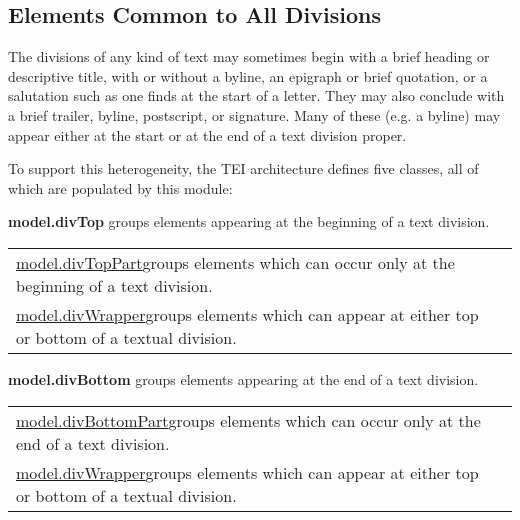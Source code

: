 \subsection[{Elements Common to All Divisions}]{Elements Common to All Divisions}\label{DSDTB}\par
The divisions of any kind of text may sometimes begin with a brief heading or descriptive title, with or without a byline, an epigraph or brief quotation, or a salutation such as one finds at the start of a letter. They may also conclude with a brief trailer, byline, postscript, or signature. Many of these (e.g. a byline) may appear either at the start or at the end of a text division proper.\par
To support this heterogeneity, the TEI architecture defines five classes, all of which are populated by this module: 
\begin{sansreflist}
  
\item [\textbf{model.divTop}] groups elements appearing at the beginning of a text division. \par 
\begin{longtable}{P{0.3332\textwidth}P{0.5167999999999999\textwidth}}
\hyperref[TEI.model.divTopPart]{model.divTopPart}\tabcellsep groups elements which can occur only at the beginning of a text division.\\
\hyperref[TEI.model.divWrapper]{model.divWrapper}\tabcellsep groups elements which can appear at either top or bottom of a textual division.\end{longtable} \par
 
\item [\textbf{model.divBottom}] groups elements appearing at the end of a text division. \par 
\begin{longtable}{P{0.35359999999999997\textwidth}P{0.49639999999999995\textwidth}}
\hyperref[TEI.model.divBottomPart]{model.divBottomPart}\tabcellsep groups elements which can occur only at the end of a text division.\\
\hyperref[TEI.model.divWrapper]{model.divWrapper}\tabcellsep groups elements which can appear at either top or bottom of a textual division.\end{longtable} \par
 

\end{sansreflist}
